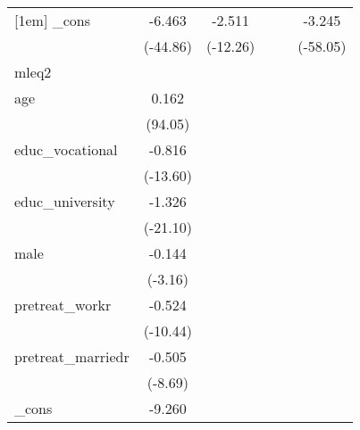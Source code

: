 {\begin{tabular}{l*{5}{c}}
[1em]
\_cons      &      -6.463\sym{***}&      -2.511\sym{***}&                     &                     &      -3.245\sym{***}\\
            &    (-44.86)         &    (-12.26)         &                     &                     &    (-58.05)         \\
\hline
mleq2       &                     &                     &                     &                     &                     \\
age         &       0.162\sym{***}&                     &                     &                     &                     \\
            &     (94.05)         &                     &                     &                     &                     \\
[1em]
educ\_vocational&      -0.816\sym{***}&                     &                     &                     &                     \\
            &    (-13.60)         &                     &                     &                     &                     \\
[1em]
educ\_university&      -1.326\sym{***}&                     &                     &                     &                     \\
            &    (-21.10)         &                     &                     &                     &                     \\
[1em]
male        &      -0.144\sym{**} &                     &                     &                     &                     \\
            &     (-3.16)         &                     &                     &                     &                     \\
[1em]
pretreat\_workr&      -0.524\sym{***}&                     &                     &                     &                     \\
            &    (-10.44)         &                     &                     &                     &                     \\
[1em]
pretreat\_marriedr&      -0.505\sym{***}&                     &                     &                     &                     \\
            &     (-8.69)         &                     &                     &                     &                     \\
[1em]
\_cons      &      -9.260\sym{***}&                     &                     &                     &                     \\

\end{tabular}}
